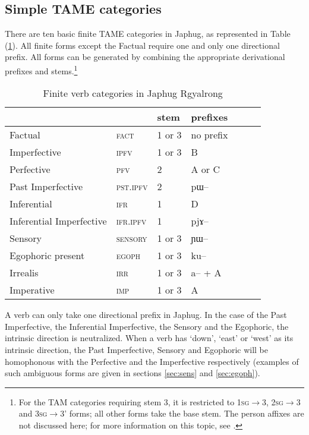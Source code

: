 \documentclass[oldfontcommands,oneside,a4paper,11pt]{article}
\newcommand{\ipa}[1]{{\phon \mbox{#1}}} %
\newcommand{\refb}[1]{(\ref{#1})}
\begin{document}
\subsection{Simple TAME categories} \label{sec:finite.TAM}
There are ten basic finite TAME categories in Japhug, as represented in Table \refb{tab:finite.forms}. All finite forms except the Factual require one and only one directional prefix. All forms can be generated  by combining the appropriate derivational prefixes and stems.\footnote{For the TAM categories requiring stem 3, it is restricted to  \textsc{1sg}$\rightarrow$3, \textsc{2sg}$\rightarrow$3 and \textsc{3sg}$\rightarrow$3' forms; all other forms take the base stem.  The person affixes  are not discussed here; for  more information on this topic, see \citet{jacques10inverse}.}

\begin{table}[H]
\caption{Finite verb categories in Japhug Rgyalrong} \label{tab:finite.forms} \centering
\begin{tabular}{lllllll}
\toprule
&	&	stem&	prefixes\\
\midrule
Factual&	\textsc{fact} &	1 or 3&	no prefix\\
Imperfective&	\textsc{ipfv} &	1 or 3&	B\\
Perfective&	\textsc{pfv} &	2&	A or C\\
Past Imperfective&	\textsc{pst.ipfv} &	2&	\ipa{pɯ--}\\
Inferential&	\textsc{ifr} &	1&	D\\
Inferential Imperfective&	\textsc{ifr.ipfv} &	1&	\ipa{pjɤ--}\\
Sensory&	\textsc{sensory} &	1 or 3&	\ipa{ɲɯ--}\\
Egophoric present&	\textsc{egoph} &	1 or 3&	\ipa{ku--}\\
Irrealis&	\textsc{irr} &	1 or 3&	\ipa{a--} + A\\
Imperative&	\textsc{imp} &	1 or 3&	A\\
\bottomrule
\end{tabular}
\end{table}

A verb can only take one directional prefix in Japhug. In the case of the Past Imperfective, the Inferential Imperfective, the Sensory and the Egophoric, the intrinsic direction is neutralized. When a verb has `down', `east' or `west' as its intrinsic direction, the Past Imperfective, Sensory and Egophoric will be homophonous with the Perfective and the Imperfective respectively (examples of such ambiguous forms are given in sections \ref{sec:sens} and \ref{sec:egoph}).
\end{document}
